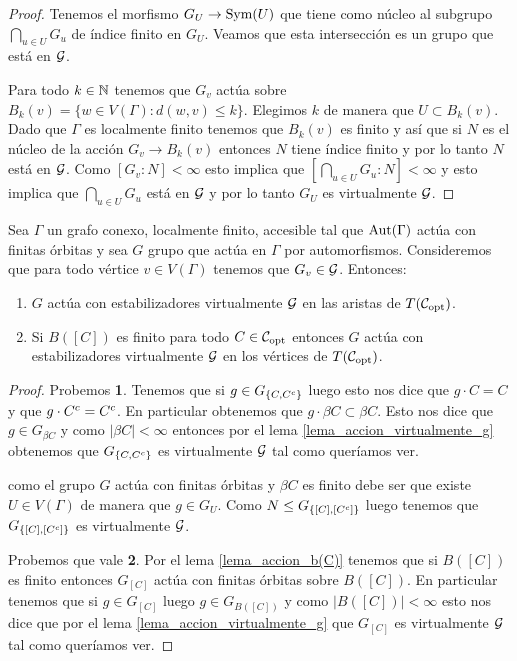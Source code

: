 \documentclass[tesis.tex]{subfiles}
\begin{document}
\begin{proof}
	Tenemos el morfismo $G_{U} \to \text{Sym}(U)$ que tiene como núcleo al subgrupo $\bigcap_{u \in U} G_u$ de índice finito en $G_U$.
	Veamos que esta intersección es un grupo que está en ${\cal G}$.
	
	Para todo $k \in \mathbb{N}$ tenemos que $G_{v}$ actúa sobre $B_{k}(v) = \{ w \in V(\Gamma) : d(w,v) \le k  \}$.
	Elegimos $k$ de manera que ${ U} \subset B_{k}(v)$.
	Dado que $\Gamma$ es localmente finito tenemos que $B_{k}(v)$ es finito y así que si $N$ es el núcleo de la acción $G_{v} \to B_{k}(v)$ entonces $N$ tiene índice finito y por lo tanto $N$ está en ${\cal G}$.
	Como $[G_{v} : N] < \infty$ esto implica que $ [\bigcap_{u \in U} G_{u} : N] < \infty$
	y esto implica que $ \bigcap_{u \in U} G_{u}$ está en ${\cal G}$ y por lo tanto $G_{ U}$ es virtualmente ${\cal G}$.
\end{proof}


\begin{prop}\label{prop_clase_grupos_accion}
	Sea $\Gamma$ un grafo conexo, localmente finito, accesible tal que $\text{Aut}(\Gamma)$ actúa con finitas órbitas y sea $G$ grupo que actúa en $\Gamma$ por automorfismos.
	Consideremos que para todo vértice $v \in V(\Gamma)$ tenemos que $G_{v} \in {\cal G}$.
	Entonces:
	\begin{enumerate}
		\item $G$ actúa con estabilizadores virtualmente ${\cal G}$ en las aristas de $T({\cal C}_{\text{opt}})$.
		\item Si $B([C])$ es finito para todo $C \in {\cal C}_{\text{opt}}$ entonces $G$ actúa con estabilizadores virtualmente ${\cal G}$ en los vértices de $T({\cal C}_{\text{opt}})$.
	\end{enumerate}	
\end{prop}

\begin{proof}
	Probemos \textbf{1}.
	Tenemos que si $g \in G_{\{C,C^{c}\}}$ luego esto nos dice que $g \cdot C = C $ y que $g \cdot C^{c} = C^{c}$. 
	En particular obtenemos que $g \cdot \beta C \subset \beta C$.
	Esto nos dice que $g \in G_{\beta C}$ y como $|\beta C| < \infty$ entonces por el lema \ref{lema_accion_virtualmente_g} obtenemos que $G_{\{C,C^{c}\}}$ es virtualmente ${\cal G}$ tal como queríamos ver.
	
	como el grupo $G$ actúa con finitas órbitas y $\beta C$ es finito debe ser que existe $U \in V(\Gamma)$ de manera que $g \in G_{U}$.
	Como $N \le G_{\{[C],[C^{c}]\}}$ luego tenemos que $G_{\{[C],[C^{c}]\}}$ es virtualmente ${\cal G}$.
	
	Probemos que vale \textbf{2}.
	Por el lema \ref{lema_accion_b(C)} tenemos que si $B([C])$ es finito entonces $G_{[C]}$ actúa con finitas órbitas sobre $B([C])$.
	En particular tenemos que si $g \in G_{[C]}$ luego $g \in G_{B([C])}$ y como $|B([C])| < \infty$ esto nos dice que por el lema \ref{lema_accion_virtualmente_g} que $G_{[C]}$ es virtualmente ${\cal G}$ tal como queríamos ver.
	
\end{proof}
\end{document}
